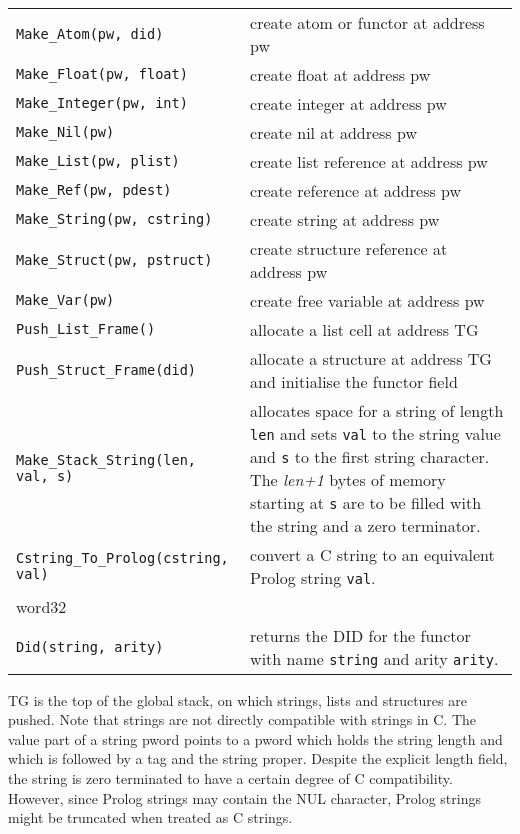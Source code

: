\noindent
 \\
\begin{tabular}{|p{7.3cm}p{8.0cm}|} 
\hline
{\tt Make_Atom(pw, did)} & create atom or functor at address pw\\
{\tt Make_Float(pw, float)} & create float at address pw\\
{\tt Make_Integer(pw, int)} & create integer at address pw\\
{\tt Make_Nil(pw)} & create nil at address pw\\
{\tt Make_List(pw, plist)} & create list reference at address pw\\
{\tt Make_Ref(pw, pdest)} & create reference at address pw\\
{\tt Make_String(pw, cstring)} & create string at address pw\\
{\tt Make_Struct(pw, pstruct)} & create structure reference at address pw\\
{\tt Make_Var(pw)} & create free variable at address pw\\
{\tt Push_List_Frame()} & allocate a list cell at address TG\\
{\tt Push_Struct_Frame(did)} & allocate a structure at address TG and 
initialise the functor field\\
{\tt Make_Stack_String(len, val, s)} &
allocates space for a string of length {\tt len} and sets {\tt val}
to the string value and {\tt s} to the first string character.
The {\it len+1} bytes of memory starting at {\tt s} are to be filled
with the string and a zero terminator.\\
{\tt Cstring_To_Prolog(cstring, val)} &
convert a C string to an equivalent Prolog string {\tt val}.\\
word32 &\\
{\tt Did(string, arity)} &
returns the DID for the functor with name {\tt string} and arity {\tt arity}.\\
\hline
\end{tabular}


\vspace*{0.5cm}

\noindent
TG is the top of the global stack, on which strings, lists and structures
are pushed.
Note that \eclipse strings are not directly compatible with strings in C.
The value part of a string pword points to a pword which holds
the string length and which is followed by  a tag and the string proper.
Despite the explicit length field, the string is zero terminated
to have a certain degree of C compatibility. However, since Prolog
strings may contain the NUL character, Prolog strings might be truncated
when treated as C strings.

